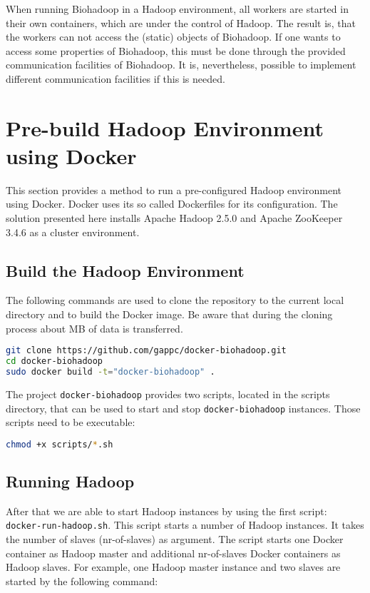 When running Biohadoop in a Hadoop environment, all workers are started in their own containers, which are under the control of Hadoop. The result is, that the workers can not access the (static) objects of Biohadoop. If one wants to access some properties of Biohadoop, this must be done through the provided communication facilities of Biohadoop. It is, nevertheless, possible to implement different communication facilities if this is needed.

\section{Pre-build Hadoop Environment using Docker}
\label{chap:appendix:biohadoop-docker}
This section provides a method to run a pre-configured Hadoop environment using Docker. Docker uses its so called Dockerfiles for its configuration. The solution presented here installs Apache Hadoop 2.5.0 and Apache ZooKeeper 3.4.6 as a cluster environment.

\subsection{Build the Hadoop Environment}
The following commands are used to clone the repository to the current local directory and to build the Docker image. Be aware that during the cloning process about \unit[400]{MB} of data is transferred.
\begin{lstlisting}[language=bash]
git clone https://github.com/gappc/docker-biohadoop.git
cd docker-biohadoop
sudo docker build -t="docker-biohadoop" .
\end{lstlisting}

The project \texttt{docker-biohadoop} provides two scripts, located in the scripts directory, that can be used to start and stop \texttt{docker-biohadoop} instances. Those scripts need to be executable:

\begin{lstlisting}[language=bash]
chmod +x scripts/*.sh
\end{lstlisting}

\subsection{Running Hadoop}
After that we are able to start Hadoop instances by using the first script: \texttt{docker-run-hadoop.sh}. This script starts a number of Hadoop instances. It takes the number of slaves (nr-of-slaves) as argument. The script starts one Docker container as Hadoop master and additional nr-of-slaves Docker containers as Hadoop slaves. For example, one Hadoop master instance and two slaves are started by the following command:

